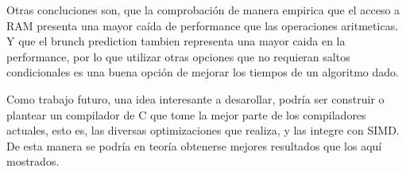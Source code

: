 \documentclass[a4paper]{article}
\begin{document}
Otras concluciones son, que la comprobación de manera empirica que el acceso a RAM presenta una mayor caída de performance que las operaciones aritmeticas. Y que el brunch prediction tambien representa una mayor caida en la performance, por lo que utilizar otras opciones que no requieran saltos condicionales es una buena opción de mejorar los tiempos de un algoritmo dado.

Como trabajo futuro, una idea interesante a desarollar, podría ser construir o plantear un compilador de C que tome la mejor parte de los compiladores actuales, esto es, las diversas optimizaciones que realiza, y las integre con SIMD. De esta manera se podría en teoría obtenerse mejores resultados que los aquí mostrados.
\end{document}
